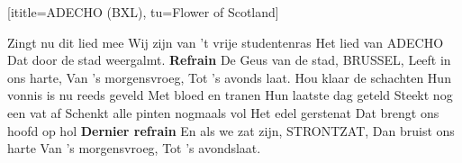[ititle={ADECHO (BXL)},
tu={Flower of Scotland}]

\beginverse
Zingt nu dit lied mee
Wij zijn van 't vrije studentenras
Het lied van ADECHO
Dat door de stad weergalmt.
\endverse
\beginchorus
\textbf{Refrain}
De Geus van de stad,
BRUSSEL,
Leeft in ons harte,
Van 's morgensvroeg,
Tot 's avonds laat.
\endchorus
\beginverse
Hou klaar de schachten
Hun vonnis is nu reeds geveld
Met bloed en tranen
Hun laatste dag geteld
\endverse
\beginverse
Steekt nog een vat af
Schenkt alle pinten nogmaals vol
Het edel gerstenat
Dat brengt ons hoofd op hol
\endverse
\beginchorus
\textbf {Dernier refrain}
En als we zat zijn,
STRONTZAT,
Dan bruist ons harte
Van 's morgensvroeg,
Tot 's avondslaat.
\endchorus
\endsong

%
